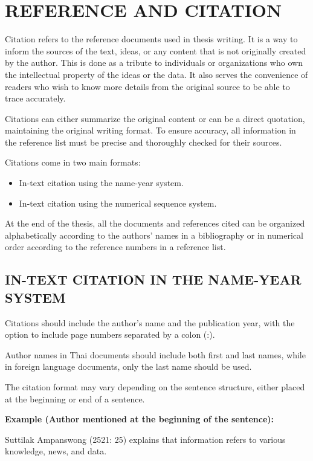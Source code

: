 \chapter{REFERENCE AND CITATION}

Citation refers to the reference documents used in thesis writing. It is a way to inform the sources of the text, ideas, or any content that is not originally created by the author. This is done as a tribute to individuals or organizations who own the intellectual property of the ideas or the data. It also serves the convenience of readers who wish to know more details from the original source to be able to trace accurately.

Citations can either summarize the original content or can be a direct quotation, maintaining the original writing format. To ensure accuracy, all information in the reference list must be precise and thoroughly checked for their sources.

Citations come in two main formats:
\begin{itemize}
    \item In-text citation using the name-year system.
    \item In-text citation using the numerical sequence system.
\end{itemize}

At the end of the thesis, all the documents and references cited can be organized alphabetically according to the authors' names in a bibliography or in numerical order according to the reference numbers in a reference list.

\section{IN-TEXT CITATION IN THE NAME-YEAR SYSTEM}

Citations should include the author's name and the publication year, with the option to include page numbers separated by a colon (:).

Author names in Thai documents should include both first and last names, while in foreign language documents, only the last name should be used.

The citation format may vary depending on the sentence structure, either placed at the beginning or end of a sentence.

\textbf{Example (Author mentioned at the beginning of the sentence):}

Suttilak Ampanswong (2521: 25) explains that information refers to various knowledge, news, and data.

